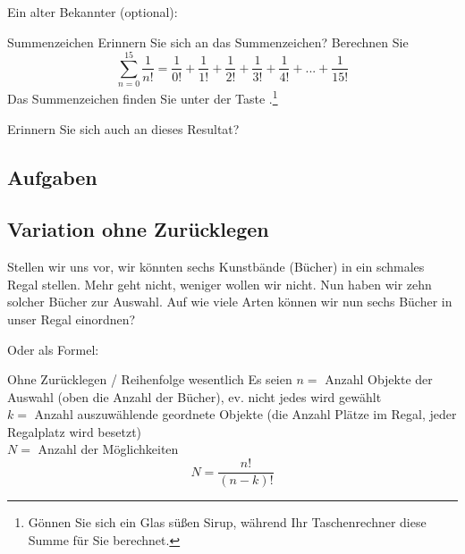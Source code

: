 Ein alter Bekannter (optional):

\vspace{3mm}

\begin{bemerkung}{Summenzeichen}{}
Erinnern Sie sich an das Summenzeichen? Berechnen
Sie $$\sum_{n=0}^{15}\frac{1}{n!} = \frac{1}{0!} + \frac{1}{1!}
+ \frac1{2!} + \frac1{3!} + \frac1{4!} + ... + \frac1{15!}$$ Das Summenzeichen finden Sie unter
der Taste .\footnote{Gönnen Sie sich
ein Glas süßen Sirup, während Ihr Taschenrechner diese Summe für Sie berechnet.}
\end{bemerkung}

Erinnern Sie sich auch an dieses Resultat? 



\subsection*{Aufgaben}
\newpage


\subsection{Variation ohne Zurücklegen}
Stellen wir uns vor, wir könnten sechs Kunstbände (Bücher) in ein schmales
Regal stellen. Mehr geht nicht, weniger wollen wir nicht.
Nun haben wir zehn solcher Bücher zur Auswahl. Auf wie viele Arten können wir nun sechs Bücher in unser Regal einordnen?


Oder als Formel:
\begin{gesetz}{Ohne Zurücklegen / Reihenfolge wesentlich}{}
Es seien
$n = $ Anzahl Objekte der Auswahl (oben die Anzahl der Bücher), ev. nicht jedes wird gewählt\\
$k = $ Anzahl auszuwählende geordnete Objekte (die Anzahl Plätze im Regal, jeder Regalplatz wird besetzt)\\
$N = $ Anzahl der Möglichkeiten\\

$$N =\frac{n!}{(n-k)!}$$
\end{gesetz}

